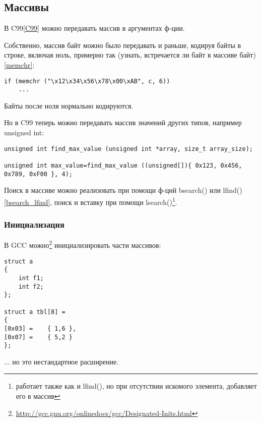 ﻿\subsection{Массивы}

В C99\ref{C99} можно передавать массив в аргументах ф-ции.

Собственно, массив байт можно было передавать и раньше, кодируя байты в строке, включая ноль, примерно так
(узнать, встречается ли байт  в массиве байт)\ref{memchr}:

\begin{lstlisting}
if (memchr ("\x12\x34\x56\x78\x00\xAB", c, 6))
	...
\end{lstlisting}

Байты после ноля нормально кодируются.

Но в C99 теперь можно передавать массив значений других типов, например unsigned int:

\begin{lstlisting}
unsigned int find_max_value (unsigned int *array, size_t array_size);

unsigned int max_value=find_max_value ((unsigned[]){ 0x123, 0x456, 0x789, 0xF00 }, 4);
\end{lstlisting}

Поиск в массиве можно реализовать при помощи ф-ций bsearch() или lfind()\ref{bsearch_lfind}, 
поиск и вставку при помощи lsearch()\footnote{работает также как и lfind(), но при отсутствии искомого элемента,
добавляет его в массив}.

\subsubsection{Инициализация}

В GCC можно\footnote{\url{http://gcc.gnu.org/onlinedocs/gcc/Designated-Inits.html}} инициализировать части массивов:

\begin{lstlisting}
struct a
{
	int f1;
	int f2;
};
 
struct a tbl[8] =
{
[0x03] =	{ 1,6 },
[0x07] =	{ 5,2 } 
};
\end{lstlisting}

... но это нестандартное расширение.

